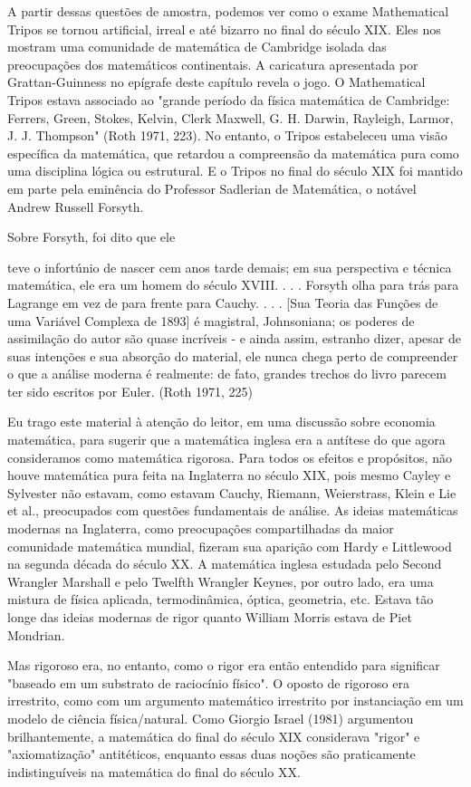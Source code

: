 \documentclass[a4paper,12pt]{article}[abntex2]
\begin{document}
A partir dessas questões de amostra, podemos ver como o exame Mathematical Tripos se tornou artificial, irreal e até bizarro no final do século XIX. Eles nos mostram uma comunidade de matemática de Cambridge isolada das preocupações dos matemáticos continentais. A caricatura apresentada por Grattan-Guinness no epígrafe deste capítulo revela o jogo. O Mathematical Tripos estava associado ao "grande período da física matemática de Cambridge: Ferrers, Green, Stokes, Kelvin, Clerk Maxwell, G. H. Darwin, Rayleigh, Larmor, J. J. Thompson" (Roth 1971, 223). No entanto, o Tripos estabeleceu uma visão específica da matemática, que retardou a compreensão da matemática pura como uma disciplina lógica ou estrutural. E o Tripos no final do século XIX foi mantido em parte pela eminência do Professor Sadlerian de Matemática, o notável Andrew Russell Forsyth.

Sobre Forsyth, foi dito que ele

teve o infortúnio de nascer cem anos tarde demais; em sua perspectiva e técnica matemática, ele era um homem do século XVIII. . . . Forsyth olha para trás para Lagrange em vez de para frente para Cauchy. . . . [Sua Teoria das Funções de uma Variável Complexa de 1893] é magistral, Johnsoniana; os poderes de assimilação do autor são quase incríveis - e ainda assim, estranho dizer, apesar de suas intenções e sua absorção do material, ele nunca chega perto de compreender o que a análise moderna é realmente: de fato, grandes trechos do livro parecem ter sido escritos por Euler. (Roth 1971, 225)

Eu trago este material à atenção do leitor, em uma discussão sobre economia matemática, para sugerir que a matemática inglesa era a antítese do que agora consideramos como matemática rigorosa. Para todos os efeitos e propósitos, não houve matemática pura feita na Inglaterra no século XIX, pois mesmo Cayley e Sylvester não estavam, como estavam Cauchy, Riemann, Weierstrass, Klein e Lie et al., preocupados com questões fundamentais de análise. As ideias matemáticas modernas na Inglaterra, como preocupações compartilhadas da maior comunidade matemática mundial, fizeram sua aparição com Hardy e Littlewood na segunda década do século XX. A matemática inglesa estudada pelo Second Wrangler Marshall e pelo Twelfth Wrangler Keynes, por outro lado, era uma mistura de física aplicada, termodinâmica, óptica, geometria, etc. Estava tão longe das ideias modernas de rigor quanto William Morris estava de Piet Mondrian.

Mas rigoroso era, no entanto, como o rigor era então entendido para significar "baseado em um substrato de raciocínio físico". O oposto de rigoroso era irrestrito, como com um argumento matemático irrestrito por instanciação em um modelo de ciência física/natural. Como Giorgio Israel (1981) argumentou brilhantemente, a matemática do final do século XIX considerava "rigor" e "axiomatização" antitéticos, enquanto essas duas noções são praticamente indistinguíveis na matemática do final do século XX.
\end{document}

